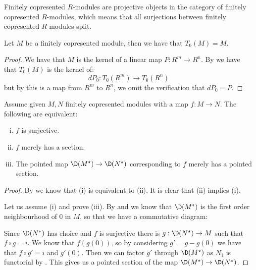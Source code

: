 Finitely copresented $R$-modules are projective objects in the category of finitely copresented $R$-modules, which means that all surjections between finitely copresented $R$-modules split.

\begin{lemma}\label{tangent-copresented-modules}
Let $M$ be a finitely copresented module, then we have that $T_0(M) = M$.
\end{lemma}

\begin{proof}
We have that $M$ is the kernel of a linear map $P:R^m\to R^n$. By  we have that $T_0(M)$ is the kernel of:
\[dP_0:T_0(R^m)\to T_0(R^n)\]
but by  this is a map from $R^m$ to $R^n$, we omit the verification that $dP_0 = P$.
\end{proof}

\begin{lemma}\label{neighborhood-tangent-correspondence-smooth}
Assume given $M,N$ finitely copresented modules with a map $f:M\to N$. The following are equivalent:
\begin{enumerate}[(i)]
\item $f$ is surjective.
\item $f$ merely has a section.
\item The pointed map $\D(M^\star) \to \D(N^\star)$ corresponding to $f$ merely has a pointed section.
\end{enumerate}
\end{lemma}

\begin{proof}
By  we know that (i) is equivalent to (ii). It is clear that (ii) implies (i).

Let us assume (i) and prove (iii). By  and  we know that $\D(M^*)$ is the first order neighbourhood of $0$ in $M$, so that we have a commutative diagram:
\begin{center}
\end{center}
Since $\D(N^*)$ has choice and $f$ is surjective there is $g:\D(N^\star)\to M$ such that $f\circ g = i$. We know that $f(g(0))$, so by considering $g'=g-g(0)$ we have that $f\circ g' = i$ and $g'(0)$.
Then we can factor $g'$ through $\D(M^\star)$ as $N_1$ is functorial by . This gives us a pointed section of the map $\D(M^\star) \to \D(N^\star)$.
\end{proof}

